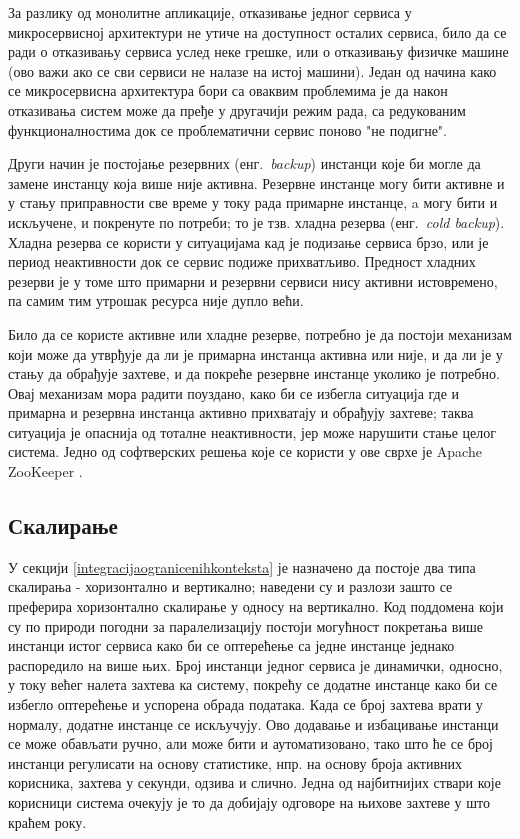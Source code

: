 \documentclass[12pt,oneside]{memoir}
\begin{document}
За разлику од монолитне апликације, отказивање једног сервиса у микросервисној архитектури не утиче на доступност осталих сервиса, било да се ради о отказивању сервиса услед неке грешке, или о отказивању физичке машине (ово важи ако се сви сервиси не налазе на истој машини). Један од начина како се микросервисна архитектура бори са оваквим проблемима је да након отказивања систем може да пређе у другачији режим рада, са редукованим функционалностима док се проблематични сервис поново "не подигне".

Други начин је постојање резервних (енг.~\textit{backup}) инстанци које би могле да замене инстанцу која више није активна. Резервне инстанце могу бити активне и у стању приправности све време у току рада примарне инстанце, a могу бити и искључене, и покренуте по потреби; то је тзв. хладна резерва (енг.~\textit{cold backup}). Хладна резерва се користи у ситуацијама кад је подизање сервиса брзо, или је период неактивности док се сервис подиже прихватљиво. Предност хладних резерви је у томе што примарни и резервни сервиси нису активни истовремено, па самим тим утрошак ресурса није дупло већи.

Било да се користе активне или хладне резерве, потребно је да постоји механизам који може да утврђује да ли је примарна инстанца активна или није, и да ли је у стању да обрађује захтеве, и да покреће резервне инстанце уколико је потребно. Овај механизам мора радити поуздано, како би се избегла ситуација где и примарна и резервна инстанца активно прихватају и обрађују захтеве; таква ситуација је опаснија од тоталне неактивности, јер може нарушити стање целог система. Једно од софтверских решења које се користи у ове сврхе је Apache ZooKeeper \cite{Zookeeper}.

\subsection{Скалирање}
У секцији \ref{integracijaogranicenihkonteksta} је назначено да постоје два типа скалирања - хоризонтално и вертикално; наведени су и разлози зашто се преферира хоризонтално скалирање у односу на вертикално. Код поддомена који су по природи погодни за паралелизацију постоји могућност покретања више инстанци истог сервиса како би се оптерећење са једне инстанце једнако распоредило на више њих. Број инстанци једног сервиса је динамички, односно, у току већег налета захтева ка систему, покрећу се додатне инстанце како би се избегло оптерећење и успорена обрада података. Када се број захтева врати у нормалу, додатне инстанце се искључују. Ово додавање и избацивање инстанци се може обављати ручно, али може бити и аутоматизовано, тако што ће се број инстанци регулисати на основу статистике, нпр. на основу броја активних корисника, захтева у секунди, одзива и слично. Једна од најбитнијих ствари које корисници система очекују је то да добијају одговоре на њихове захтеве у што краћем року.
\end{document}

